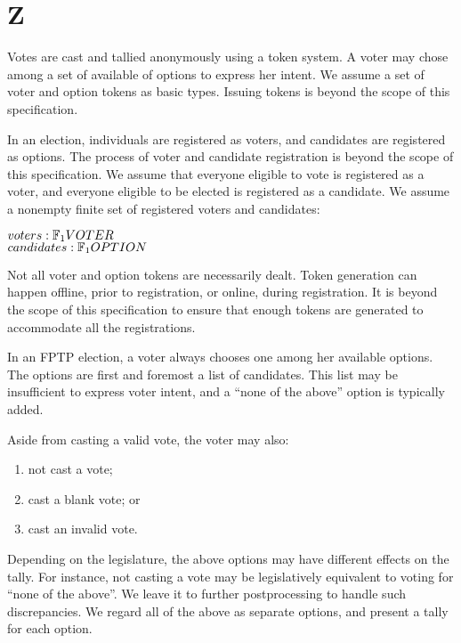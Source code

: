 \chapter{Z}

Votes are cast and tallied anonymously using a token system. A voter may chose
among a set of available of options to express her intent. We assume a set of
voter and option tokens as basic types. Issuing tokens is beyond the scope of
this specification.

\begin{zed}
\end{zed}

In an election, individuals are registered as voters, and candidates are
registered as options. The process of voter and candidate registration is
beyond the scope of this specification. We assume that everyone eligible to
vote is registered as a voter, and everyone eligible to be elected is
registered as a candidate. We assume a nonempty finite set of registered voters
and candidates:

\begin{axdef}
$voters : \finset_1 VOTER$ \\
$candidates: \finset_1 OPTION$
\end{axdef}

Not all voter and option tokens are necessarily dealt. Token generation can
happen offline, prior to registration, or online, during registration. It is
beyond the scope of this specification to ensure that enough tokens are
generated to accommodate all the registrations.

In an FPTP election, a voter always chooses one among her available options.
The options are first and foremost a list of candidates. This list may be
insufficient to express voter intent, and a ``none of the above'' option is
typically added.

Aside from casting a valid vote, the voter may also:

\begin{enumerate}

\item not cast a vote;

\item cast a blank vote; or

\item cast an invalid vote.

\end{enumerate}

Depending on the legislature, the above options may have different effects on
the tally. For instance, not casting a vote may be legislatively equivalent to
voting for ``none of the above''. We leave it to further postprocessing to
handle such discrepancies. We regard all of the above as separate options, and
present a tally for each option.


